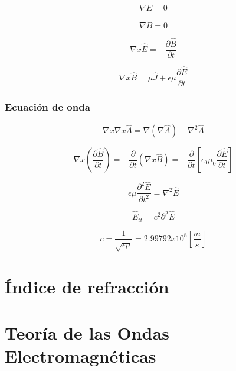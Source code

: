 \documentclass[]{article}
\begin{document}
\begin{equation}
\nabla \hat{E}=0
\end{equation}

\begin{equation}
\nabla \hat{B}=0
\end{equation}

\begin{equation}
\nabla x \hat{E}=-\frac{\partial \hat{B}}{\partial t}
\end{equation}

\begin{equation}
\nabla x \hat{B}=\mu\hat{J}+\epsilon\mu\frac{\partial \hat{E}}{\partial{t}}
\end{equation}

\subsubsection{Ecuación de onda}


\begin{equation}
\nabla x \nabla x \hat{A}=\nabla(\nabla \hat{A})-\nabla^2\hat{A}
\end{equation}

\begin{equation}
\nabla x (\frac{\partial \hat{B}}{\partial t})=-\frac{\partial}{\partial t}(\nabla x \hat{B})=-\frac{\partial}{\partial t}[\epsilon_0\mu_0\frac{\partial \hat{E}}{\partial t}]
\end{equation}

\begin{equation}
\epsilon \mu \frac{\partial^2 \hat{E}}{\partial t^2}=\nabla^2\hat{E}
\end{equation}

\begin{equation}
\hat{E}_{tt}=c^2 \partial^2 \hat{E}
\end{equation}

\begin{equation}
c=\frac{1}{\sqrt{\epsilon \mu}}=2.99792x10^8 [\frac{m}{s}]
\end{equation}

\section{Índice de refracción}



\section{Teoría de las Ondas Electromagnéticas}
\end{document}
